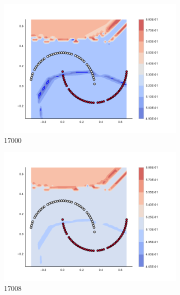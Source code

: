 \begin{figure}[h]
\begin{subfigure}[b]{0.09\textwidth}
    \includegraphics[clip, trim=2.35cm 1.75cm 4.5cm 0cm,width=\textwidth]{img/convergence/17000.pdf}
    \caption{17000}
    \label{fig:convergence_17000}
\end{subfigure}
%
\begin{subfigure}[b]{0.09\textwidth}
    \includegraphics[clip, trim=2.35cm 1.75cm 4.5cm 0cm,width=\textwidth]{img/convergence/17008.pdf}
    \caption{17008}
    \label{fig:convergence_17008}
\end{subfigure}
%
\begin{subfigure}[b]{0.09\textwidth}

\end{subfigure}
\end{figure}
